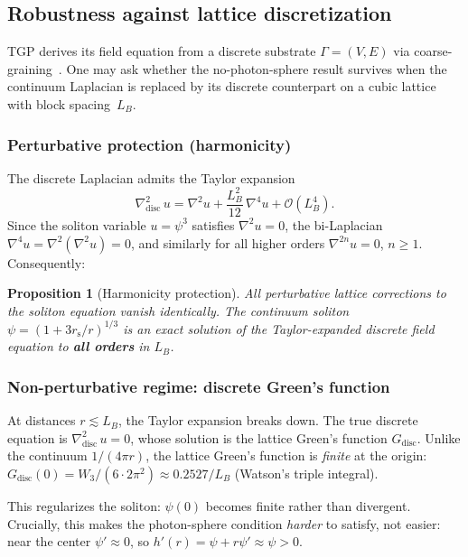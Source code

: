 \documentclass[11pt,a4paper]{article}
\newtheorem{proposition}[theorem]{Proposition}
\theoremstyle{definition}
\theoremstyle{remark}
\newcommand{\rs}{r_{\mathrm{s}}}
\begin{document}
\subsection{Robustness against lattice discretization}%
\label{ssec:lattice-robustness}

TGP derives its field equation from a discrete substrate
$\Gamma = (V,E)$ via coarse-graining~\cite{Serafin2026-full}.  One may
ask whether the no-photon-sphere result survives when the continuum
Laplacian is replaced by its discrete counterpart on a cubic lattice
with block spacing~$L_{B}$.

\subsubsection{Perturbative protection (harmonicity)}

The discrete Laplacian admits the Taylor expansion
\begin{equation}\label{eq:disc-lap}
  \nabla^{2}_{\mathrm{disc}}\,u
  = \nabla^{2} u + \frac{L_{B}^{2}}{12}\,\nabla^{4} u
    + \mathcal{O}(L_{B}^{4}).
\end{equation}
Since the soliton variable $u = \psi^{3}$ satisfies
$\nabla^{2} u = 0$, the bi-Laplacian
$\nabla^{4} u = \nabla^{2}(\nabla^{2} u) = 0$, and similarly for all
higher orders $\nabla^{2n} u = 0$, $n \geq 1$.  Consequently:

\begin{proposition}[Harmonicity protection]\label{prop:lattice-protect}
All perturbative lattice corrections to the soliton equation vanish
identically.  The continuum soliton $\psi = (1+3\rs/r)^{1/3}$ is an
exact solution of the Taylor-expanded discrete field equation to
\textbf{all orders} in $L_{B}$.
\end{proposition}

\subsubsection{Non-perturbative regime: discrete Green's function}

At distances $r \lesssim L_{B}$, the Taylor expansion breaks down.  The
true discrete equation is $\nabla^{2}_{\mathrm{disc}}\,u = 0$, whose
solution is the lattice Green's function $G_{\mathrm{disc}}$.  Unlike the
continuum $1/(4\pi r)$, the lattice Green's function is \emph{finite}
at the origin: $G_{\mathrm{disc}}(0) = W_{3}/(6\cdot 2\pi^{2})
\approx 0.2527/L_{B}$ (Watson's triple integral).

This regularizes the soliton: $\psi(0)$ becomes finite rather than
divergent.  Crucially, this makes the photon-sphere condition
\emph{harder} to satisfy, not easier: near the center $\psi' \approx 0$,
so $h'(r) = \psi + r\psi' \approx \psi > 0$.
\end{document}
